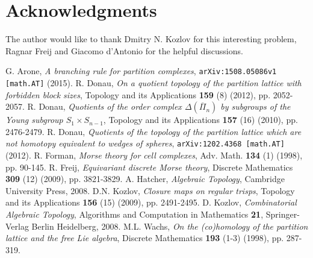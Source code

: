 \documentclass{elsarticle}
\begin{document}
\section*{Acknowledgments}
The author would like to thank Dmitry N. Kozlov for this interesting problem, Ragnar Freij and Giacomo d'Antonio for the helpful discussions.

\begin{thebibliography}{00}
G. Arone, \textit{A branching rule for partition complexes}, \texttt{arXiv:1508.05086v1 [math.AT]} (2015).
R. Donau, \textit{On a quotient topology of the partition lattice with forbidden block sizes}, Topology and its Applications \textbf{159} (8) (2012), pp. 2052-2057.
R. Donau, \textit{Quotients of the order complex $\Delta(\overline{\Pi}_n)$ by subgroups of the Young subgroup $S_1\times S_{n-1}$}, Topology and its Applications \textbf{157} (16) (2010), pp. 2476-2479.
R. Donau, \textit{Quotients of the topology of the partition lattice which are not homotopy equivalent to wedges of spheres}, \texttt{arXiv:1202.4368 [math.AT]} (2012).
R. Forman, \textit{Morse theory for cell complexes}, Adv. Math. \textbf{134} (1) (1998), pp. 90-145.
R. Freij, \textit{Equivariant discrete Morse theory}, Discrete Mathematics \textbf{309} (12) (2009), pp. 3821-3829.
A. Hatcher, \textit{Algebraic Topology}, Cambridge University Press, 2008.
D.N. Kozlov, \textit{Closure maps on regular trisps}, Topology and its Applications \textbf{156} (15) (2009), pp. 2491-2495.
D. Kozlov, \textit{Combinatorial Algebraic Topology}, Algorithms and Computation in Mathematics \textbf{21}, Springer-Verlag Berlin Heidelberg, 2008.
M.L. Wachs, \textit{On the (co)homology of the partition lattice and the free Lie algebra}, Discrete Mathematics \textbf{193} (1-3) (1998), pp. 287-319.
\end{thebibliography}
\end{document}
